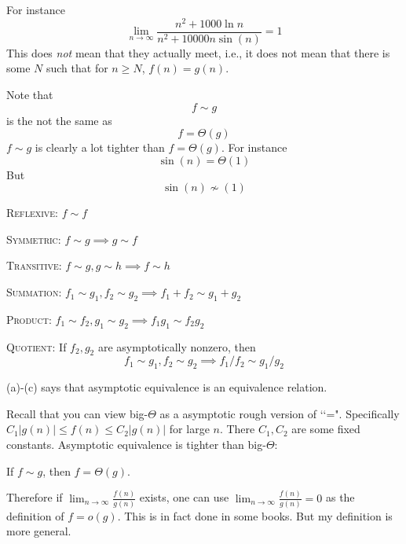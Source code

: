For instance
\[
\lim_{n \rightarrow \infty} \frac{n^2 + 1000\ln n}{n^2 + 10000n\sin(n)}
= 1
\]
This does \textit{not} mean that they actually meet, i.e., 
it does not mean that there is some $N$ such that 
for $n \geq N$, $f(n) = g(n)$.

Note that
\[
f \sim g
\]
is the not the same as
\[
f = \Theta(g)
\]
$f \sim g$ is clearly a lot tighter than $f = \Theta(g)$.
For instance
\[
\sin(n) = \Theta(1)
\]
But
\[
\sin(n) \not\sim (1)
\]

\begin{prop}
\mbox{}
\begin{myenum}
\item \textsc{Reflexive:} $f \sim f$
\item \textsc{Symmetric:} $f \sim g \implies g \sim f$
\item \textsc{Transitive:} $f \sim g, g \sim h \implies f \sim h$
\item \textsc{Summation:} $f_1 \sim g_1, f_2 \sim g_2
  \implies f_1 + f_2 \sim g_1 + g_2$
\item \textsc{Product:}
  $f_1 \sim f_2, g_1 \sim g_2
  \implies f_1 g_1 \sim f_2 g_2$
\item \textsc{Quotient:}
  If $f_2, g_2$ are asymptotically nonzero, then
  \[
  f_1 \sim g_1, f_2 \sim g_2 \implies f_1/f_2 \sim g_1/g_2
  \]
\end{myenum}
(a)-(c) says that asymptotic equivalence is an equivalence
relation.
\end{prop}

Recall that you can view big-$\Theta$ as a asymptotic rough version
of \lq\lq =".
Specifically $C_1|g(n)| \leq f(n) \leq C_2|g(n)|$ for large $n$.
There $C_1,C_2$ are some fixed constants.
Asymptotic equivalence is tighter than big-$\Theta$:

\begin{prop}
If $f \sim g$, then $f = \Theta(g)$. 
\end{prop}

Therefore if $\displaystyle\lim_{n \rightarrow \infty} \frac{f(n)}{g(n)}$ exists,
one can use $\displaystyle\lim_{n \rightarrow \infty} \frac{f(n)}{g(n)} = 0$ as the
definition of $f = o(g)$.
This is in fact done in some books.
But my definition is more general.

